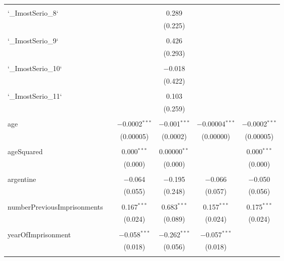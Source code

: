 \documentclass{article}
\begin{document}
\begin{table}[!htbp]
{\begin{tabular}{@{\extracolsep{5pt}}lccccc}
  & & & & & \\ 
 `\_ImostSerio\_8` &  &  & 0.289 &  &  \\ 
  &  &  & (0.225) &  &  \\ 
  & & & & & \\ 
 `\_ImostSerio\_9` &  &  & 0.426 &  &  \\ 
  &  &  & (0.293) &  &  \\ 
  & & & & & \\ 
 `\_ImostSerio\_10` &  &  & $-$0.018 &  &  \\ 
  &  &  & (0.422) &  &  \\ 
  & & & & & \\ 
 `\_ImostSerio\_11` &  &  & 0.103 &  &  \\ 
  &  &  & (0.259) &  &  \\ 
  & & & & & \\ 
 age &  & $-$0.0002$^{***}$ & $-$0.001$^{***}$ & $-$0.00004$^{***}$ & $-$0.0002$^{***}$ \\ 
  &  & (0.00005) & (0.0002) & (0.00000) & (0.00005) \\ 
  & & & & & \\ 
 ageSquared &  & 0.000$^{***}$ & 0.00000$^{**}$ &  & 0.000$^{***}$ \\ 
  &  & (0.000) & (0.000) &  & (0.000) \\ 
  & & & & & \\ 
 argentine &  & $-$0.064 & $-$0.195 & $-$0.066 & $-$0.050 \\ 
  &  & (0.055) & (0.248) & (0.057) & (0.056) \\ 
  & & & & & \\ 
 numberPreviousImprisonments &  & 0.167$^{***}$ & 0.683$^{***}$ & 0.157$^{***}$ & 0.175$^{***}$ \\ 
  &  & (0.024) & (0.089) & (0.024) & (0.024) \\ 
  & & & & & \\ 
 yearOfImprisonment &  & $-$0.058$^{***}$ & $-$0.262$^{***}$ & $-$0.057$^{***}$ &  \\ 
  &  & (0.018) & (0.056) & (0.018) &  \\ 
  & & & & & \\ 


\end{tabular}}
\end{table}
\end{document}
